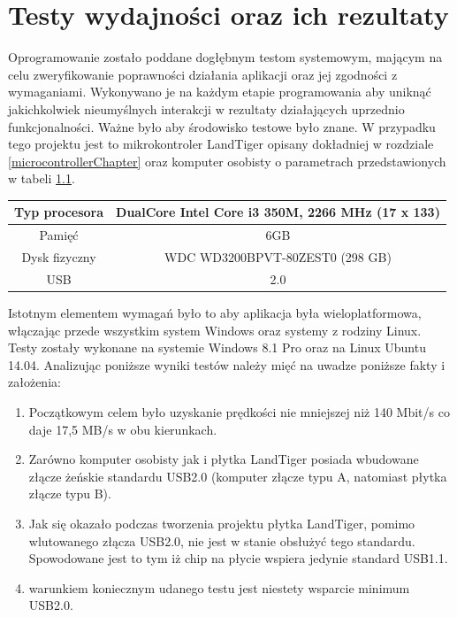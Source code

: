 \documentclass{BscUS}
\begin{document}
\chapter{Testy wydajności oraz ich rezultaty}
\label{resultsChapter}
\indent Oprogramowanie zostało poddane dogłębnym testom systemowym, mającym na celu zweryfikowanie poprawności działania aplikacji oraz jej zgodności z wymaganiami. Wykonywano je na każdym etapie programowania aby uniknąć jakichkolwiek nieumyślnych interakcji w rezultaty działających uprzednio funkcjonalności. Ważne było aby środowisko testowe było znane. W przypadku tego projektu jest to mikrokontroler LandTiger opisany dokładniej w rozdziale \ref{microcontrollerChapter} oraz komputer osobisty o parametrach przedstawionych w tabeli \ref{tbl:pcParameters}.
\begin{table}[H]
\centering
\begin{tabular}{|c|c|}
\hline
	\rowcolor[gray]{0.8}
	Typ procesora & DualCore Intel Core i3 350M, 2266 MHz (17 x 133) \\ \hline
	
	Pamięć & 6GB \\ \hline
	 \rowcolor[gray]{0.8}
	 Dysk fizyczny & WDC WD3200BPVT-80ZEST0  (298 GB) \\ \hline
	USB & 2.0 \\ \hline
\end{tabular}
\label{tbl:pcParameters}
\end{table}
\noindent Istotnym elementem wymagań było to aby aplikacja była wieloplatformowa, włączając przede wszystkim system Windows oraz systemy z rodziny Linux. Testy zostały wykonane na systemie Windows 8.1 Pro oraz na Linux Ubuntu 14.04.
\noindent Analizując poniższe wyniki testów należy mięć na uwadze poniższe fakty i założenia:
\begin{enumerate}
\item Początkowym celem było uzyskanie prędkości nie mniejszej niż 140 Mbit/s co daje 17,5 MB/s w obu kierunkach.
\item Zarówno komputer osobisty jak i płytka LandTiger posiada wbudowane złącze żeńskie standardu USB2.0 (komputer złącze typu A, natomiast płytka złącze typu B).
\item Jak się okazało podczas tworzenia projektu płytka LandTiger, pomimo wlutowanego złącza USB2.0, nie jest w stanie obsłużyć tego standardu. Spowodowane jest to tym iż chip na płycie wspiera jedynie standard USB1.1.
\item warunkiem koniecznym udanego testu jest niestety wsparcie minimum USB2.0.
\end{enumerate}
\end{document}
